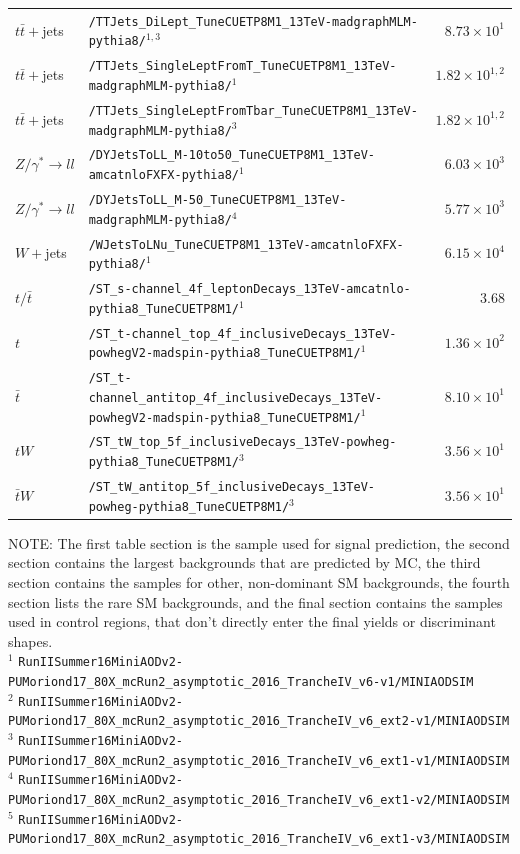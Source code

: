 \begin{landscape}
\begin{longtable}{lp{6.0in}r}
\midrule
$t\bar{t}+$jets & \texttt{/TTJets\_DiLept\_TuneCUETP8M1\_13TeV-madgraphMLM-pythia8/}$^{1,3}$ & $8.73 \times 10^{1}$ \\
$t\bar{t}+$jets & \texttt{/TTJets\_SingleLeptFromT\_TuneCUETP8M1\_13TeV-madgraphMLM-pythia8/}$^{1}$ & $1.82 \times 10^{1,2}$ \\
$t\bar{t}+$jets & \texttt{/TTJets\_SingleLeptFromTbar\_TuneCUETP8M1\_13TeV-madgraphMLM-pythia8/}$^{3}$ & $1.82 \times 10^{1,2}$ \\
$Z/\gamma^{*}\rightarrow ll$ & \texttt{/DYJetsToLL\_M-10to50\_TuneCUETP8M1\_13TeV-amcatnloFXFX-pythia8/}$^{1}$ & $6.03 \times 10^{3}$ \\
$Z/\gamma^{*}\rightarrow ll$ & \texttt{/DYJetsToLL\_M-50\_TuneCUETP8M1\_13TeV-madgraphMLM-pythia8/}$^{4}$ & $5.77 \times 10^{3}$ \\
$W+$jets & \texttt{/WJetsToLNu\_TuneCUETP8M1\_13TeV-amcatnloFXFX-pythia8/}$^{1}$ & $6.15 \times 10^{4}$ \\
$t/\bar{t}$ & \texttt{/ST\_s-channel\_4f\_leptonDecays\_13TeV-amcatnlo-pythia8\_TuneCUETP8M1/}$^{1}$ & $3.68$ \\
$t$ & \texttt{/ST\_t-channel\_top\_4f\_inclusiveDecays\_13TeV-powhegV2-madspin-pythia8\_TuneCUETP8M1/}$^{1}$ & $1.36 \times 10^{2}$ \\
$\bar{t}$ & \texttt{/ST\_t-channel\_antitop\_4f\_inclusiveDecays\_13TeV-powhegV2-madspin-pythia8\_TuneCUETP8M1/}$^{1}$ & $8.10 \times 10^{1}$ \\
$tW$ & \texttt{/ST\_tW\_top\_5f\_inclusiveDecays\_13TeV-powheg-pythia8\_TuneCUETP8M1/}$^{3}$ & $3.56 \times 10^{1}$ \\
$\bar{t}W$ & \texttt{/ST\_tW\_antitop\_5f\_inclusiveDecays\_13TeV-powheg-pythia8\_TuneCUETP8M1/}$^{3}$ & $3.56 \times 10^{1}$ \\

\end{longtable}
{\footnotesize
NOTE: The first table section is the sample used for signal prediction, the second section contains the largest backgrounds
that are predicted by MC, the third section contains the samples for other, non-dominant SM backgrounds, the fourth section lists the rare SM backgrounds, and the final section
contains the samples used in control regions, that don't directly enter the final yields or discriminant shapes.\\
$^{1}$ \texttt{RunIISummer16MiniAODv2-PUMoriond17\_80X\_mcRun2\_asymptotic\_2016\_TrancheIV\_v6-v1/MINIAODSIM} \\
$^{2}$ \texttt{RunIISummer16MiniAODv2-PUMoriond17\_80X\_mcRun2\_asymptotic\_2016\_TrancheIV\_v6\_ext2-v1/MINIAODSIM} \\
$^{3}$ \texttt{RunIISummer16MiniAODv2-PUMoriond17\_80X\_mcRun2\_asymptotic\_2016\_TrancheIV\_v6\_ext1-v1/MINIAODSIM} \\
$^{4}$ \texttt{RunIISummer16MiniAODv2-PUMoriond17\_80X\_mcRun2\_asymptotic\_2016\_TrancheIV\_v6\_ext1-v2/MINIAODSIM} \\
$^{5}$ \texttt{RunIISummer16MiniAODv2-PUMoriond17\_80X\_mcRun2\_asymptotic\_2016\_TrancheIV\_v6\_ext1-v3/MINIAODSIM} \\
} %


\end{landscape}
